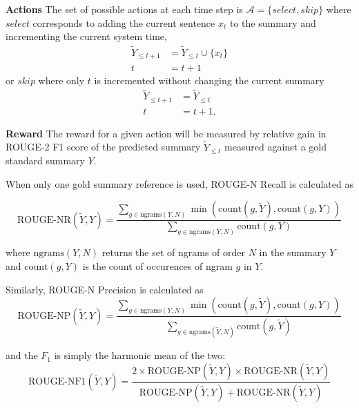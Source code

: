 \documentclass[12pt]{article}
\begin{document}
    \textbf{Actions} 
    The set of possible actions at each time step is 
    $\mathcal{A} = \{select, skip\}$ where $select$ corresponds to adding the 
    current sentence $x_t$ to the summary and incrementing the current system
    time, 
    \begin{align*}
        \tilde{Y}_{\le t + 1} &= \tilde{Y}_{\le t} \cup \{ x_t \} \\
        t &= t + 1    
    \end{align*}
    or $skip$ where only $t$ is incremented without changing the current 
    summary
    \begin{align*}
        \tilde{Y}_{\le t + 1} &= \tilde{Y}_{\le t}  \\
        t &= t + 1.
    \end{align*}


    \textbf{Reward} 
    The reward for a given action will be measured by relative gain in 
    ROUGE-2 F1 score of the predicted summary $\tilde{Y}_{\le t}$ measured
    against a gold standard summary $Y$.


     
    When only one gold summary reference is used, ROUGE-N Recall is calculated
    as 

    \[ \textrm{ROUGE-NR}(\tilde{Y}, Y) = 
        \frac{\sum_{g \in \textrm{ngrams}(Y,N)} 
        \min \left(\textrm{count}(g, \tilde{Y}), \textrm{count}(g, Y)\right)}{
        \sum_{g \in \textrm{ngrams}(Y,N)} 
        \textrm{count}(g, Y)
        }
    \]

    where $\textrm{ngrams}(Y, N)$ returns the set of ngrams of order $N$ in 
    the summary $Y$ and $\textrm{count}(g, Y)$ is the count of occurences of
    ngram $g$ in $Y.$

    Similarly, ROUGE-N Precision is calculated as 
    \[ \textrm{ROUGE-NP}(\tilde{Y}, Y) = 
        \frac{\sum_{g \in \textrm{ngrams}(Y,N)} 
        \min \left(\textrm{count}(g, \tilde{Y}), \textrm{count}(g, Y)\right)}{
            \sum_{g \in \textrm{ngrams}(\tilde{Y},N)} 
            \textrm{count}(g, \tilde{Y})
        }
    \]

    and the $F_1$ is simply the harmonic mean of the two:
    \[ \textrm{ROUGE-NF1}(\tilde{Y}, Y) = \frac{ 2 \times 
    \textrm{ROUGE-NP}(\tilde{Y}, Y) \times \textrm{ROUGE-NR}(\tilde{Y}, Y)
    }{ \textrm{ROUGE-NP}(\tilde{Y}, Y) + \textrm{ROUGE-NR}(\tilde{Y}, Y) } \]
        
\end{document}
